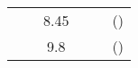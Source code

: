 \documentclass[../main.tex]{subfiles}%
\begin{document}
\begin{table}
\begin{tabu}{ l c c l r l }
            && \num{8.45} && \citeauthor*{Kamijoh_1982} & (\citeyear*{Kamijoh_1982})\\%
            && \num{9.8} && \citeauthor*{Vijayakumar_2014} & (\citeyear*{Vijayakumar_2014})\\%
            \toprule%
        \end{tabu}%
    \end{table}%
\end{document}
